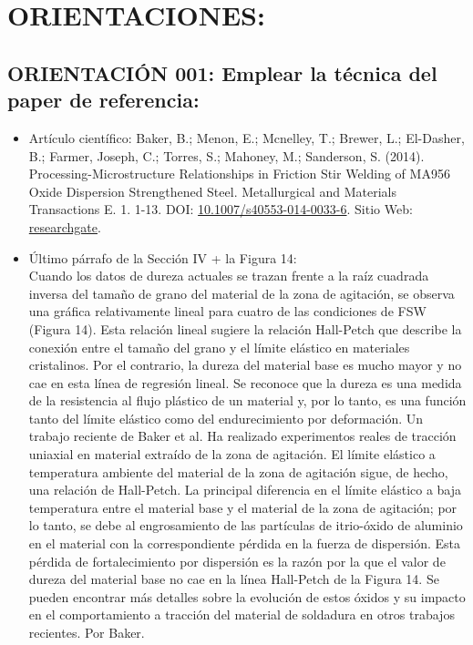 \documentclass[12pt,a4paper]{article}
\begin{document}
\section{ORIENTACIONES:}

    \subsection{ORIENTACIÓN 001: Emplear la técnica del paper de referencia:}
    \begin{itemize}
        \item Artículo científico:  Baker, B.; Menon, E.; Mcnelley, T.; Brewer, L.; El-Dasher, B.; Farmer, Joseph, C.; Torres, S.; Mahoney, M.; Sanderson, S. (2014). Processing-Microstructure Relationships in Friction Stir Welding of MA956 Oxide Dispersion Strengthened Steel. Metallurgical and Materials Transactions E. 1. 1-13. DOI: \href{http://dx.doi.org/10.1007/s40553-014-0033-6}{10.1007/s40553-014-0033-6}. Sitio Web: \href{https://www.researchgate.net/publication/305807425_Processing-Microstructure_Relationships_in_Friction_Stir_Welding_of_MA956_Oxide_Dispersion_Strengthened_Steel#fullTextFileContent}{researchgate}.
        \item Último párrafo de la Sección IV + la Figura 14:\\
        Cuando los datos de dureza actuales se trazan frente a la raíz cuadrada inversa del tamaño de grano del material de la zona de agitación, se observa una gráfica relativamente lineal para cuatro de las condiciones de FSW (Figura 14). Esta relación lineal sugiere la relación Hall-Petch que describe la conexión entre el tamaño del grano y el límite elástico en materiales cristalinos. Por el contrario, la dureza del material base es mucho mayor y no cae en esta línea de regresión lineal. Se reconoce que la dureza es una medida de la resistencia al flujo plástico de un material y, por lo tanto, es una función tanto del límite elástico como del endurecimiento por deformación. Un trabajo reciente de Baker et al. Ha realizado experimentos reales de tracción uniaxial en material extraído de la zona de agitación. El límite elástico a temperatura ambiente del material de la zona de agitación sigue, de hecho, una relación de Hall-Petch. La principal diferencia en el límite elástico a baja temperatura entre el material base y el material de la zona de agitación; por lo tanto, se debe al engrosamiento de las partículas de itrio-óxido de aluminio en el material con la correspondiente pérdida en la fuerza de dispersión. Esta pérdida de fortalecimiento por dispersión es la razón por la que el valor de dureza del material base no cae en la línea Hall-Petch de la Figura 14. Se pueden encontrar más detalles sobre la evolución de estos óxidos y su impacto en el comportamiento a tracción del material de soldadura en otros trabajos recientes. Por Baker.

\end{itemize}
\end{document}
